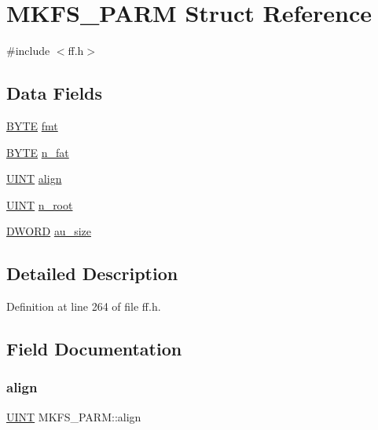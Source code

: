 \hypertarget{structMKFS__PARM}{}\section{M\+K\+F\+S\+\_\+\+P\+A\+RM Struct Reference}
\label{structMKFS__PARM}


{\ttfamily \#include $<$ff.\+h$>$}

\subsection*{Data Fields}
\begin{DoxyCompactItemize}
\item 
\hyperlink{ff_8h_a4ae1dab0fb4b072a66584546209e7d58}{B\+Y\+TE} \hyperlink{structMKFS__PARM_a54cb609ecff9f1586f3628b00aeb8f23}{fmt}
\item 
\hyperlink{ff_8h_a4ae1dab0fb4b072a66584546209e7d58}{B\+Y\+TE} \hyperlink{structMKFS__PARM_a0ff8e4728bddfe0636c50367af399e25}{n\+\_\+fat}
\item 
\hyperlink{ff_8h_a36cb3b01d81ffd844bbbfb54003e06ec}{U\+I\+NT} \hyperlink{structMKFS__PARM_af244e017c4cb2c821e5e819fff7db710}{align}
\item 
\hyperlink{ff_8h_a36cb3b01d81ffd844bbbfb54003e06ec}{U\+I\+NT} \hyperlink{structMKFS__PARM_a2b8a26b614381e0c2e0ff26f138feea6}{n\+\_\+root}
\item 
\hyperlink{ff_8h_ad342ac907eb044443153a22f964bf0af}{D\+W\+O\+RD} \hyperlink{structMKFS__PARM_adb29b0af8e486fc53d8b629c3e49d567}{au\+\_\+size}
\end{DoxyCompactItemize}


\subsection{Detailed Description}


Definition at line 264 of file ff.\+h.



\subsection{Field Documentation}
\mbox{\label{structMKFS__PARM_af244e017c4cb2c821e5e819fff7db710}} 
\subsubsection{\texorpdfstring{align}{align}}
{\footnotesize\ttfamily \hyperlink{ff_8h_a36cb3b01d81ffd844bbbfb54003e06ec}{U\+I\+NT} M\+K\+F\+S\+\_\+\+P\+A\+R\+M\+::align}



